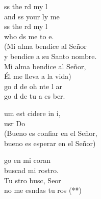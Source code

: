 \documentclass[12pt]{article}
\begin{document}
\begin{multicols*}{2}
\begin{cancion}%
	ss the rd my l\\
	and ss your ly me\\
	ss the rd my l\\
	who ds me to e.\\
(Mi alma bendice al Señor\\
y bendice a su Santo nombre.\\
Mi alma bendice al Señor,\\
Él me lleva a la vida)\\
\jump
	go d de  oh nte l ar\\
	go d de  tu a es ber.\\
\end{cancion}%

\begin{cancion}%
	um est cidere in i,\\
	usr Do\\
(Bueno es confiar en el Señor,\\
 bueno es esperar en el Señor)\\
\end{cancion}%

\begin{cancion}%
	go en mi coran \\
buscad mi rostro.\\
	Tu stro busc, Seor \\
	no me esndas tu ros (**)\\
\end{cancion}%


\end{multicols*}
\end{document}
